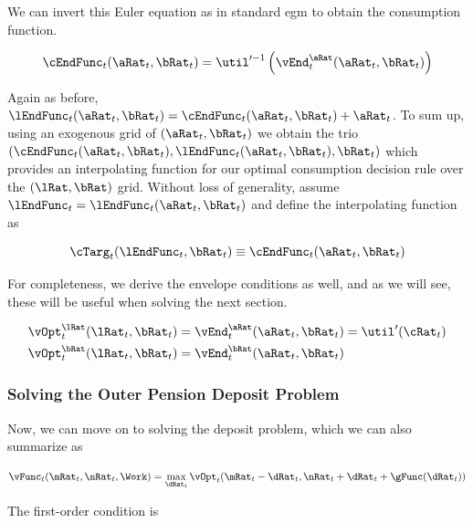 \documentclass{article}
\begin{document}
We can invert this Euler equation as in standard \acrshort{egm} to obtain the consumption function.

\begin{equation}
\cEndFunc_{t}(\aRat_{t}, \bRat_{t}) =
    \util'^{-1}\left(\vEnd_{t}^{\aRat}(\aRat_{t}, \bRat_{t})\right)
\end{equation}

Again as before, $\lEndFunc_{t}(\aRat_{t}, \bRat_{t}) =
\cEndFunc_{t}(\aRat_{t}, \bRat_{t}) + \aRat_{t}$. To sum up, using an exogenous grid of $(\aRat_{t}, \bRat_{t})$ we obtain the trio $(\cEndFunc_{t}(\aRat_{t},
\bRat_{t}), \lEndFunc_{t}(\aRat_{t},
\bRat_{t}), \bRat_{t})$ which provides an interpolating function for our optimal consumption decision rule over the
$(\lRat, \bRat)$ grid. Without loss of generality, assume $\lEndFunc_{t} =
\lEndFunc_{t}(\aRat_{t}, \bRat_{t})$ and define the interpolating function as

\begin{equation}
\cTarg_{t}(\lEndFunc_{t}, \bRat_{t}) \equiv \cEndFunc_{t}(\aRat_{t},
    \bRat_{t})
\end{equation}

For completeness, we derive the envelope conditions as well, and as we will see, these will be useful when solving the next section.

\begin{equation}
\begin{split}
        \vOpt_{t}^{\lRat}(\lRat_{t}, \bRat_{t}) & =
        \vEnd_{t}^{\aRat}(\aRat_{t}, \bRat_{t}) = \util'(\cRat_{t}) \\
        \vOpt_{t}^{\bRat}(\lRat_{t}, \bRat_{t}) & =
        \vEnd_{t}^{\bRat}(\aRat_{t}, \bRat_{t})
    \end{split}
\end{equation}

\subsubsection{Solving the Outer Pension Deposit Problem}

Now, we can move on to solving the deposit problem, which we can also summarize as

\begin{equation}
\vFunc_{t}(\mRat_{t}, \nRat_{t}, \Work) = \max_{\dRat_{t}}
    \vOpt_{t}(\mRat_{t}
    - \dRat_{t}, \nRat_{t} + \dRat_{t} + \gFunc(\dRat_{t}))
\end{equation}

The first-order condition is
\end{document}
